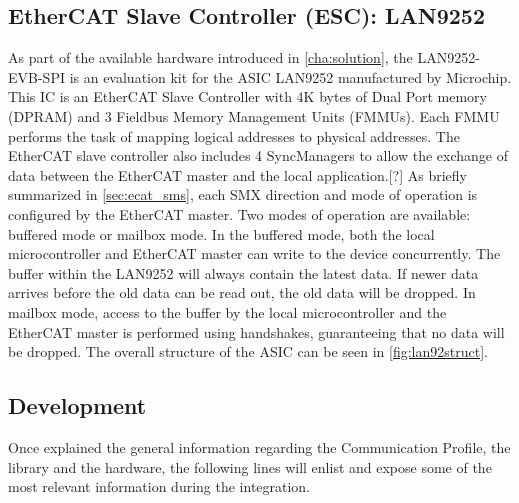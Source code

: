 \subsection{EtherCAT Slave Controller (ESC): LAN9252} 
As part of the available hardware introduced in \ref{cha:solution}, the LAN9252-EVB-SPI is an evaluation kit for the ASIC LAN9252 manufactured by Microchip. 
This IC is an EtherCAT Slave Controller with 4K bytes of Dual Port memory (DPRAM) and 3 Fieldbus Memory Management Units (FMMUs). 
Each FMMU performs the task of mapping logical addresses to physical addresses.
The EtherCAT slave controller also includes 4 SyncManagers to allow the exchange of data between the EtherCAT master and the local application.[?]%
As briefly summarized in \ref{sec:ecat_sms}, each SMX direction and mode of operation is configured by the EtherCAT master. Two modes of operation 
are available: buffered mode or mailbox mode. 
In the buffered mode, both the local microcontroller and EtherCAT master can write to the device concurrently. The buffer within the LAN9252 
will always contain the latest data. If newer data arrives before the old data can be read out, the old data will be dropped. In mailbox
mode, access to the buffer by the local microcontroller and the EtherCAT master is performed using handshakes, guaranteeing that no data 
will be dropped. The overall structure of the ASIC can be seen in \ref{fig:lan92struct}.



\subsection{Development}
Once explained the general information regarding the Communication Profile, the library and the hardware, the following lines will enlist and
expose some of the most relevant information during the integration. 

